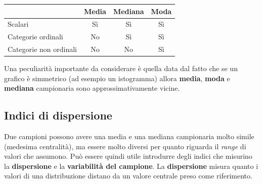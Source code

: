 \begin{center}
\begin{tabular}{ | m{3.5cm} | c | c | c | } 
    \hline &
     Media & Mediana & Moda \\
    \hline
    Scalari & 
        \cellcolor{lightgreen} \hspace{0.5cm} Sì \hspace{0.5cm} & 
        \cellcolor{lightgreen} \hspace{0.5cm} Sì \hspace{0.5cm} & 
        \cellcolor{lightgreen} \hspace{0.5cm} Sì \hspace{0.5cm}
    \\ \hline
    Categorie ordinali & 
        \cellcolor{lightred}   \hspace{0.5cm} No \hspace{0.5cm} &  %
        \cellcolor{lightgreen} \hspace{0.5cm} Sì \hspace{0.5cm} & 
        \cellcolor{lightgreen} \hspace{0.5cm} Sì \hspace{0.5cm}
    \\ \hline
    Categorie non ordinali &
        \cellcolor{lightred}   \hspace{0.5cm} No \hspace{0.5cm} & 
        \cellcolor{lightred}   \hspace{0.5cm} No \hspace{0.5cm} & 
        \cellcolor{lightgreen} \hspace{0.5cm} Sì \hspace{0.5cm} 
    \\ \hline
\end{tabular}
\end{center}

Una peculiarità importante da considerare è quella data dal fatto che se un grafico è simmetrico (ad esempio un istogramma) allora \textbf{media}, \textbf{moda} e \textbf{mediana} campionaria sono approssimativamente vicine.

\subsection{Indici di dispersione}
Due campioni possono avere una media e una mediana campionaria molto simile (medesima centralità), ma essere molto diversi per quanto riguarda il \textit{range} di valori che assumono. Può essere quindi utile introdurre degli indici che misurino la \textbf{dispersione} e la \textbf{variabilità del campione}.
La \textbf{dispersione} misura quanto i valori di una distribuzione  distano da un valore centrale preso come riferimento. 

